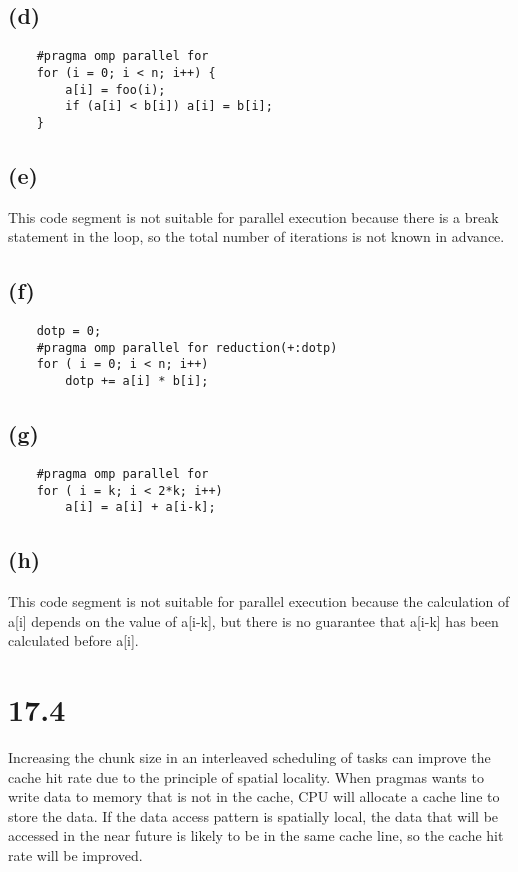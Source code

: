 \subsection*{(d)}
\begin{lstlisting}
    #pragma omp parallel for
    for (i = 0; i < n; i++) {
        a[i] = foo(i);
        if (a[i] < b[i]) a[i] = b[i]; 
    }
\end{lstlisting}
\subsection*{(e)}
This code segment is not suitable for parallel execution because there is a break statement in the loop, so the total number of iterations is not known in advance.
\subsection*{(f)}
\begin{lstlisting}
    dotp = 0;
    #pragma omp parallel for reduction(+:dotp)
    for ( i = 0; i < n; i++) 
        dotp += a[i] * b[i]; 
\end{lstlisting}
\subsection*{(g)}
\begin{lstlisting}
    #pragma omp parallel for
    for ( i = k; i < 2*k; i++) 
        a[i] = a[i] + a[i-k];
\end{lstlisting}
\subsection*{(h)}
This code segment is not suitable for parallel execution because the calculation of a[i] depends on the value of a[i-k], but there is no guarantee that a[i-k] has been calculated before a[i].

\section*{17.4}

Increasing the chunk size in an interleaved scheduling of tasks can improve the cache hit rate due to the principle of spatial locality. When pragmas wants to write data to memory that is not in the cache, CPU will allocate a cache line to store the data. If the data access pattern is spatially local, the data that will be accessed in the near future is likely to be in the same cache line, so the cache hit rate will be improved.

